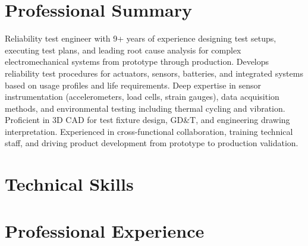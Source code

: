 \documentclass[letterpaper,11pt]{moderncv}
\begin{document}
\makecvtitle
\vspace{-3em}

\section{Professional Summary}
Reliability test engineer with 9+ years of experience designing test setups, executing test plans, and leading root cause analysis for complex electromechanical systems from prototype through production. Develops reliability test procedures for actuators, sensors, batteries, and integrated systems based on usage profiles and life requirements. Deep expertise in sensor instrumentation (accelerometers, load cells, strain gauges), data acquisition methods, and environmental testing including thermal cycling and vibration. Proficient in 3D CAD for test fixture design, GD\&T, and engineering drawing interpretation. Experienced in cross-functional collaboration, training technical staff, and driving product development from prototype to production validation.

\section{Technical Skills}
\begin{minipage}[t]{0.48\textwidth}
\end{minipage}%
\hfill
\begin{minipage}[t]{0.48\textwidth}
\end{minipage}

\section{Professional Experience}
\end{document}
